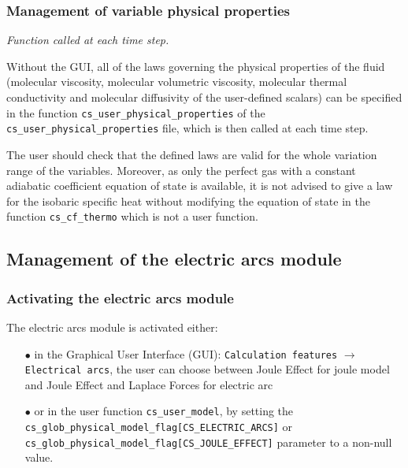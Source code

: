 \subsubsection{Management of variable physical properties}

\noindent
\textit{Function called at each time step.}

Without the GUI, all of the laws governing the physical properties of the fluid
(molecular viscosity, molecular volumetric viscosity, molecular thermal conductivity and
molecular diffusivity of the user-defined scalars) can be specified in the function \texttt{cs\_user\_physical\_properties} of
the \texttt{cs\_user\_physical\_properties} file,
which is then called at each time step. %

The user should check that the defined laws are valid for
the whole variation range of the variables. Moreover, as only the perfect gas with a constant
adiabatic coefficient equation of state is available, it is not advised to give a law for the isobaric
specific heat without modifying the equation of state in the function \texttt{cs\_cf\_thermo} which is not
a user function.

\subsection{Management of the electric arcs module}

\subsubsection{Activating the electric arcs module}\label{sec:acti-lag}

The electric arcs module is activated either:
%
\begin{itemize}
 \item [$\bullet$] in the Graphical User Interface (GUI): \texttt{Calculation features} $\rightarrow$ \texttt{Electrical arcs}, the user can choose between Joule Effect for joule model and Joule Effect and Laplace Forces for electric arc


 \item [$\bullet$] or in the user function \texttt{cs\_user\_model}, by setting the \texttt{cs\_glob\_physical\_model\_flag[CS\_ELECTRIC\_ARCS]} or \texttt{cs\_glob\_physical\_model\_flag[CS\_JOULE\_EFFECT]} parameter to a non-null value.
\end{itemize}

